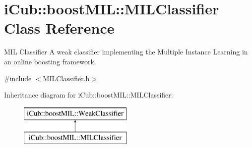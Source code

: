 \section{i\+Cub\+:\+:boost\+M\+I\+L\+:\+:M\+I\+L\+Classifier Class Reference}
\label{classiCub_1_1boostMIL_1_1MILClassifier}


M\+I\+L Classifier A weak classifier implementing the Multiple Instance Learning in an online boosting framework.  




{\ttfamily \#include $<$M\+I\+L\+Classifier.\+h$>$}

Inheritance diagram for i\+Cub\+:\+:boost\+M\+I\+L\+:\+:M\+I\+L\+Classifier\+:\begin{figure}[H]
\begin{center}
\leavevmode
\includegraphics[height=2.000000cm]{classiCub_1_1boostMIL_1_1MILClassifier}
\end{center}
\end{figure}
